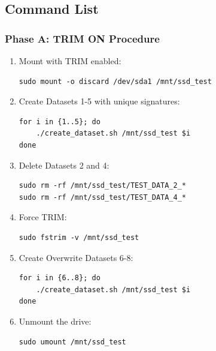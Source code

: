 \subsection{Command List}
\subsubsection*{Phase A: TRIM ON Procedure}
\begin{enumerate}
    
\item{Mount with TRIM enabled:}

\begin{verbatim}
sudo mount -o discard /dev/sda1 /mnt/ssd_test
\end{verbatim}

\item{Create Datasets 1-5 with unique signatures:}

\begin{verbatim}
for i in {1..5}; do
    ./create_dataset.sh /mnt/ssd_test $i
done
\end{verbatim}

\item{Delete Datasets 2 and 4:}

\begin{verbatim}
sudo rm -rf /mnt/ssd_test/TEST_DATA_2_*
sudo rm -rf /mnt/ssd_test/TEST_DATA_4_*
\end{verbatim}

\item{Force TRIM:}

\begin{verbatim}
sudo fstrim -v /mnt/ssd_test
\end{verbatim}

\item{Create Overwrite Datasets 6-8:}

\begin{verbatim}
for i in {6..8}; do
    ./create_dataset.sh /mnt/ssd_test $i
done
\end{verbatim}

\item{Unmount the drive:}

\begin{verbatim}
sudo umount /mnt/ssd_test
\end{verbatim}

\end{enumerate}


